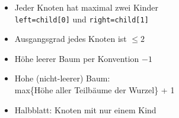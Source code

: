 \documentclass[
    12pt,
    a4paper,
    ngerman,
    color=3b,%
    marginpar=false,
    colorback=false,
    leqno,
]{tudaexercise}
\begin{document}
\begin{itemize}
\begin{itemize}
\begin{minipage}[t]{0.45\textwidth}
                        \begin{itemize}
                            \item Jeder Knoten hat maximal zwei Kinder \\
                                  \texttt{left=child[0]} und \texttt{right=child[1]}
                            \item Ausgangsgrad jedes Knoten ist $\leq 2$
                            \item Höhe leerer Baum per Konvention $-1$
                            \item Hohe (nicht-leerer) Baum: \\
                                  max\{Höhe aller Teilbäume der Wurzel\} + 1
                            \item Halbblatt: Knoten mit nur einem Kind
                        \end{itemize}
                    \end{minipage}
          \end{itemize}



\end{itemize}
\end{document}
